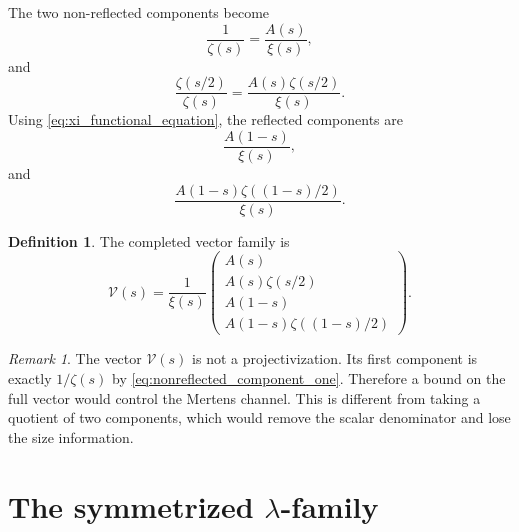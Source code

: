 \documentclass[11pt]{amsart}
\numberwithin{equation}{section}
\theoremstyle{plain}
\theoremstyle{definition}
\newtheorem{definition}[theorem]{Definition}
\theoremstyle{remark}
\newtheorem{remark}[theorem]{Remark}
\begin{document}
The two non-reflected components become
\begin{equation}
\frac1{\zeta(s)}=\frac{A(s)}{\xi(s)},
\label{eq:nonreflected_component_one}
\end{equation}
and
\begin{equation}
\frac{\zeta(s/2)}{\zeta(s)}=\frac{A(s)\zeta(s/2)}{\xi(s)}.
\label{eq:nonreflected_component_two}
\end{equation}
Using \eqref{eq:xi_functional_equation}, the reflected components are
\begin{equation}
\frac{A(1-s)}{\xi(s)},
\label{eq:reflected_component_one}
\end{equation}
and
\begin{equation}
\frac{A(1-s)\zeta((1-s)/2)}{\xi(s)}.
\label{eq:reflected_component_two}
\end{equation}

\begin{definition}
\label{def:xi_vector}
The completed vector family is
\begin{equation}
\mathcal V(s)=\frac1{\xi(s)}
\begin{pmatrix}
A(s)\\
A(s)\zeta(s/2)\\
A(1-s)\\
A(1-s)\zeta((1-s)/2)
\end{pmatrix}.
\label{eq:xi_vector_definition}
\end{equation}
\end{definition}

\begin{remark}
\label{rem:why_xi_vector_is_not_projective}
The vector \(\mathcal V(s)\) is not a projectivization.  Its first component is exactly \(1/\zeta(s)\) by \eqref{eq:nonreflected_component_one}.  Therefore a bound on the full vector would control the Mertens channel.  This is different from taking a quotient of two components, which would remove the scalar denominator and lose the size information.
\end{remark}

\section{The symmetrized \texorpdfstring{$\lambda$}{lambda}-family}
\label{sec:symmetrized_lambda_family}
\end{document}
